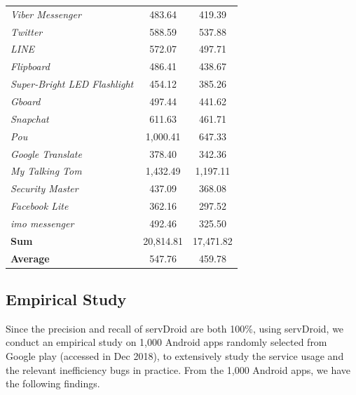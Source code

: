 \documentclass[sigconf,review, anonymous]{acmart}
\begin{document}
\begin{table}
\begin{tabular}{|l|cc|}
{\it Viber Messenger}&483.64&419.39\\
{\it Twitter}&588.59&537.88\\
{\it LINE}&572.07&497.71\\
{\it Flipboard}&486.41&438.67\\
{\it Super-Bright LED Flashlight}&454.12&385.26\\
{\it Gboard}&497.44&441.62\\
{\it Snapchat}&611.63&461.71\\
{\it Pou}&1,000.41&647.33\\
{\it Google Translate}&378.40&342.36\\
{\it My Talking Tom}&1,432.49&1,197.11\\
{\it Security Master}&437.09&368.08\\
{\it Facebook Lite}&362.16&297.52\\
{\it imo messenger}&492.46&325.50\\
\hline
{\bf Sum}&20,814.81&17,471.82\\
\hline
{\bf Average}&547.76&459.78\\
\hline
\end{tabular}
\label{tab_energy}
\end{table}


\subsection{Empirical Study}

Since the precision and recall of \textsf{servDroid} are both 100\%, using \textsf{servDroid}, we conduct an empirical
study on 1,000 Android apps randomly selected from Google play (accessed in Dec 2018), to extensively study the service usage and the relevant inefficiency bugs in practice. From the 1,000 Android apps, we have the following findings.
\end{document}
